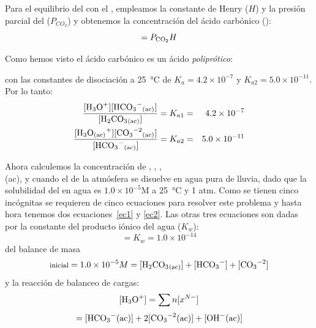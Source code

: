 
Para el equilibrio del  con el , empleamos la constante de Henry ($H$) y la presi\'on parcial del  ($P_{CO_2}$) y obtenemos la concentraci\'on del \'acido carb\'onico ():
\begin{equation}
[\ce{CO2.H2O}] =P_{\ce{CO2}}H \label{eq1}
\end{equation}

Como hemos visto el \'acido carb\'onico es un \'acido \emph{polipr\'otico}:

con las constantes de disociaci\'on   a  \SI{25}{\celsius} de $K_a=4.2\times10^{-7}$ y $K_{a2}=5.0\times10^{-11}$. Por lo tanto:
\begin{eqnarray}
\frac{[\ce{H3O+}][\ce{HCO3^-_{(ac)}}]}{[\ce{H2CO3_{(ac)}}]}&=K_{a1}=&4.2\times10^{-7}\label{ec1}\\
\frac{[\ce{H3O+_{(ac)}}][\ce{CO3^{-2}_{(ac)}}]}{[\ce{HCO3^-_{(ac)}}]}&=K_{a2}=&5.0\times10^{-11}\label{ec2}
\end{eqnarray}

Ahora calculemos la concentraci\'on de , , , \\  (ac), y  cuando el  de la atm\'osfera se disuelve en agua pura de lluvia, dado que la solubilidad del  en agua es $1.0\times10^{-5}$M a \SI{25}{\celsius}  y 1 atm.  Como se tienen cinco inc\'ognitas se requieren de cinco ecuaciones  para resolver este problema y hasta hora tenemos dos ecuaciones~\ref{ec1} y \ref{ec2}. Las otras tres ecuaciones son dadas por la constante del producto i\'onico del agua ($K_w$):
\begin{equation}
[\ce{H3O+_{(ac)}}][\ce{OH-_{(ac)}}]=K_w=1.0\times10^{-14} \label{ec3}
\end{equation}
del balance de masa
\begin{equation}
[\ce{H2CO3}]\textrm{\footnotesize inicial} = 1.0\times10^{-5} M =
[\ce{H2CO3_{(ac)}}] +[\ce{HCO3-}]+[\ce{CO3^{-2}}]
\label{ec4}
\end{equation}
y la reacci\'on de balanceo de cargas:$$[\ce{H3O+}]=\sum n[x^{N-}]$$
\begin{equation}
[\ce{H3O+(ac)}]= [\ce{HCO3^-(ac)}] +2[\ce{CO3^{-2}(ac)}]+[\ce{OH^-(ac)}]
\label{ec5}
\end{equation}

